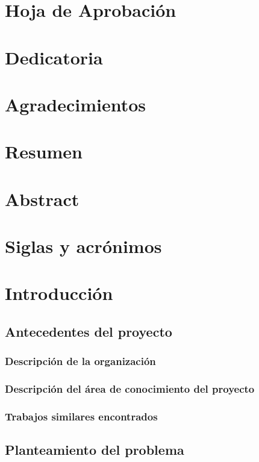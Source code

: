 \documentclass[11pt, sfdefaults=false, spanish]{scrreprt}
\begin{document}


\chapter*{Hoja de Aprobación}
\chapter*{Dedicatoria}
\chapter*{Agradecimientos}

\chapter*{Resumen}
\chapter*{Abstract}

\tableofcontents
\listoftables
\listoffigures

\chapter*{Siglas y acrónimos}

\chapter{Introducción}

\section{Antecedentes del proyecto}

\subsection{Descripción de la organización}
\subsection{Descripción del área de conocimiento del proyecto}
\subsection{Trabajos similares encontrados}

\section{Planteamiento del problema}
\end{document}
